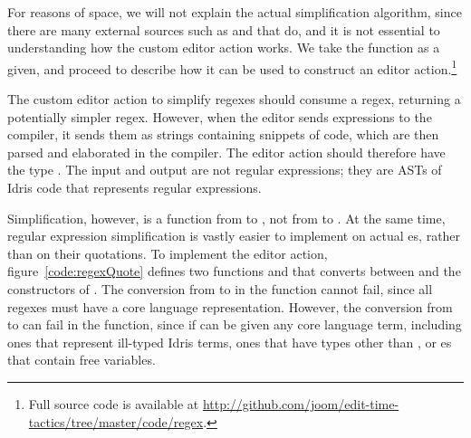 For reasons of space, we will not explain the actual simplification algorithm, since there are
many external sources such as \citet{ortizRegex} and \citet{harperRegex}
 that do, and it is not essential to understanding how the custom
editor action works.
We take the function  as a
given, and proceed to describe how it can be used to construct an editor
action.\footnote{Full source code is available at
\url{http://github.com/joom/edit-time-tactics/tree/master/code/regex}.}

The custom editor action to simplify regexes should consume a regex, returning a
potentially simpler regex. However, when the editor sends expressions to the compiler,
it sends them as strings containing snippets of code, which are then parsed and
elaborated in the compiler.  The editor action should therefore have the type
\mt{\TT{} -> \Elab{} \TT{}}. The input and output are not regular expressions;
they are ASTs of Idris code that represents regular expressions.

Simplification, however, is a function from  to , not from
 to .
At the same time, regular expression simplification is vastly easier to implement
on actual es, rather than on their quotations.
To implement the editor action, figure~\ref{code:regexQuote} defines two functions  and 
that converts between \TT{} and the constructors of . The
conversion from  to  in the  function cannot fail,
since all regexes must have a core language representation. However, the
conversion from \TT{} to  can fail in the  function,
since if  can be given any core language term, including ones that
represent ill-typed Idris terms, ones that have types other than , or es
that contain free variables.

